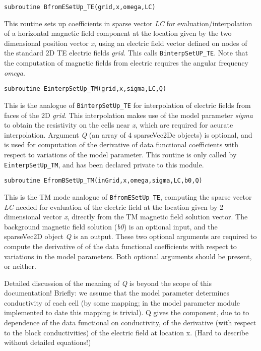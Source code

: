 \documentclass[12pt]{article}
\begin{document}
\begin{verbatim}
subroutine BfromESetUp_TE(grid,x,omega,LC)
\end{verbatim}

This routine sets up coefficients in sparse vector {\it LC} for
evaluation/interpolation of a horizontal magnetic field component
at the location given by the two dimensional position vector {\it x},
using an electric field vector defined on nodes of the standard
2D TE electric fields {\it grid}.  This calls \verb|BinterpSetUP_TE|.  Note
that the computation of magnetic fields from electric requires
the angular frequency {\it omega}.

\begin{verbatim}
subroutine EinterpSetUp_TM(grid,x,sigma,LC,Q)
\end{verbatim}

This is the analogue of \verb|BinterpSetUp_TE| for interpolation of
electric fields from faces of the 2D {\it grid}.  This interpolation
makes use of the model parameter {\it sigma} to obtain the resistivity
on the cells near {\it x},  which are required for acurate interpolation.
Argument {\it Q} (an array of 4 sparseVec2Dc objects) is optional,
and is used for computation of the derivative of data functional
coefficients with respect to variations of the model parameter.
This routine is only called by \verb|EinterpSetUp_TM|, and has
been declared private to this module.

\begin{verbatim}
subroutine EfromBSetUp_TM(inGrid,x,omega,sigma,LC,b0,Q)
\end{verbatim}

This is the TM mode analogue of \verb|BfromESetUp_TE|, computing
the sparse vector {\it LC} needed for evaluation of the electric field
at the location given by 2 dimensional vector {\it x}, directly
from the TM magnetic field solution vector.  The background
magnetic field solution ({\it b0}) is an optional input, and
the sparseVec2D object {\it Q} is an output.  These two optional
arguments are required to compute the derivative of
of the data functional coefficients with respect to variations
in the model parameters.  Both optional arguments should be present,
or neither.

Detailed discussion of the
meaning of {\it Q} is beyond the scope of this documentation!
Briefly: we assume that the model parameter determines
conductivity of each cell (by some mapping; in the model
parameter module implemented to date this mapping is trivial).  
Q gives the component, due to to dependence of the data 
functional on conductivity, of the derivative (with respect to
the block conductivities) of the electric field at location x.
(Hard to describe without detailed equations!)
\end{document}
